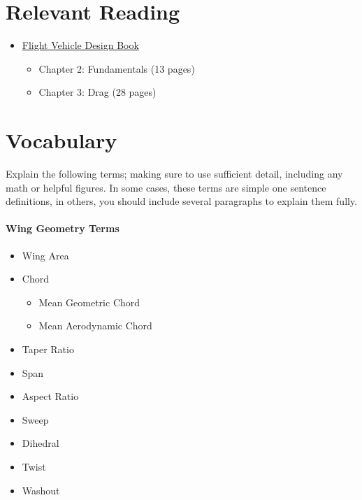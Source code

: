 \documentclass[11pt,twocolumn]{article}
\begin{document}
\section*{Relevant Reading}
\label{sec:reading}

\begin{itemize}
	\item \href{http://flowlab.groups.et.byu.net/me415/flight.pdf}{Flight Vehicle Design Book}
	\begin{itemize}
		\item Chapter 2: Fundamentals (13 pages)
		\item Chapter 3: Drag (28 pages)
	\end{itemize}

\end{itemize}





\section{Vocabulary}
\label{sec:vocab}

Explain the following terms; making sure to use sufficient detail, including any math or helpful figures.
In some cases, these terms are simple one sentence definitions, in others, you should include several paragraphs to explain them fully.

\paragraph{Wing Geometry Terms}
\begin{itemize}
	\item Wing Area
	\item Chord
	\begin{itemize}
		\item Mean Geometric Chord
		\item Mean Aerodynamic Chord
	\end{itemize}
	\item Taper Ratio
	\item Span
	\item Aspect Ratio
	\item Sweep
	\item Dihedral
	\item Twist
	\item Washout
\end{itemize}
\end{document}
